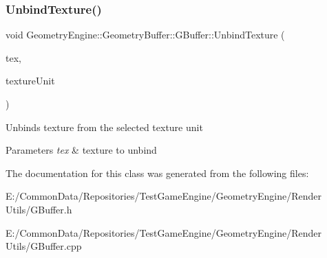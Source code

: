 \subsubsection{\texorpdfstring{UnbindTexture()}{UnbindTexture()}\hspace{0.1cm}{\footnotesize\ttfamily [2/2]}}
{\footnotesize\ttfamily void Geometry\+Engine\+::\+Geometry\+Buffer\+::\+G\+Buffer\+::\+Unbind\+Texture (\begin{DoxyParamCaption}\item[{\mbox{\hyperlink{class_geometry_engine_1_1_geometry_buffer_1_1_g_buffer_a718dceafcac1915f7de061108597e1cc}{G\+B\+U\+F\+F\+E\+R\+\_\+\+T\+E\+X\+T\+U\+R\+E\+\_\+\+T\+Y\+PE}}}]{tex,  }\item[{unsigned int}]{texture\+Unit }\end{DoxyParamCaption})}

Unbinds texture from the selected texture unit 
\begin{DoxyParams}{Parameters}
{\em tex} & texture to unbind \\
\hline
\end{DoxyParams}


The documentation for this class was generated from the following files\+:\begin{DoxyCompactItemize}
\item 
E\+:/\+Common\+Data/\+Repositories/\+Test\+Game\+Engine/\+Geometry\+Engine/\+Render Utils/G\+Buffer.\+h\item 
E\+:/\+Common\+Data/\+Repositories/\+Test\+Game\+Engine/\+Geometry\+Engine/\+Render Utils/G\+Buffer.\+cpp\end{DoxyCompactItemize}
